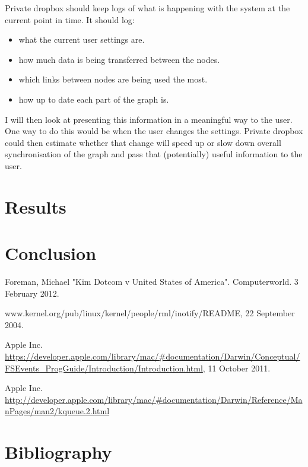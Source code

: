 \documentclass[12pt]{article}
\begin{document}
Private dropbox should keep logs of what is happening with
the system at the current point in time. 
It should log:
\begin{itemize}
    \item what the current user settings are.
    \item how much data is being transferred between the nodes.
    \item which links between nodes are being used the most.
    \item how up to date each part of the graph is.
\end{itemize}

I will then look at presenting this information
in a meaningful way to the user.
One way to do this would be when the user changes the
settings. Private dropbox could then estimate whether that
change will speed up or slow down overall synchronisation
of the graph and pass that (potentially) useful information
to the user.

\section{Results}

\section{Conclusion}


\begin{thebibliography}{9}

Foreman, Michael "Kim Dotcom v United States of America". Computerworld. 3 February 2012.

www.kernel.org/pub/linux/kernel/people/rml/inotify/README, 22 September 2004.

Apple Inc. \url{https://developer.apple.com/library/mac/#documentation/Darwin/Conceptual/FSEvents_ProgGuide/Introduction/Introduction.html}, 11 October 2011.

Apple Inc. \url{http://developer.apple.com/library/mac/#documentation/Darwin/Reference/ManPages/man2/kqueue.2.html}

\end{thebibliography}

\section{Bibliography}
\end{document}
